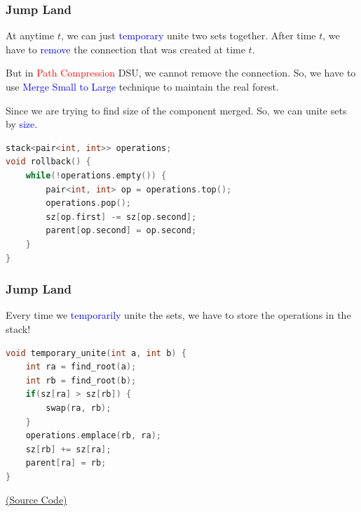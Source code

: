 \begin{frame}[fragile]
\frametitle{Jump Land}

At anytime $t$, we can just \textcolor{blue}{temporary} unite two sets together. After time $t$, we have to \textcolor{blue}{remove} the connection that was created at time $t$.

\medskip

But in \textcolor{red}{Path Compression} DSU, we cannot remove the connection. So, we have to use \textcolor{blue}{Merge Small to Large} technique to maintain the real forest.

\medskip

Since we are trying to find size of the component merged. So, we can unite sets by \textcolor{blue}{size}.

\begin{lstlisting}[language=C++, basicstyle=\small]
stack<pair<int, int>> operations;
void rollback() {
    while(!operations.empty()) {
        pair<int, int> op = operations.top();
        operations.pop();
        sz[op.first] -= sz[op.second];
        parent[op.second] = op.second;
    }
}
\end{lstlisting}

\end{frame}

\begin{frame}[fragile]
\frametitle{Jump Land}

Every time we \textcolor{blue}{temporarily} unite the sets, we have to store the operations in the stack!

\begin{lstlisting}[language=C++, basicstyle=\small]
void temporary_unite(int a, int b) {
    int ra = find_root(a);
    int rb = find_root(b);
    if(sz[ra] > sz[rb]) {
        swap(ra, rb);
    }
    operations.emplace(rb, ra);
    sz[rb] += sz[ra];
    parent[ra] = rb;
}
\end{lstlisting}

\href{https://google.com}{(Source Code)}

\end{frame}